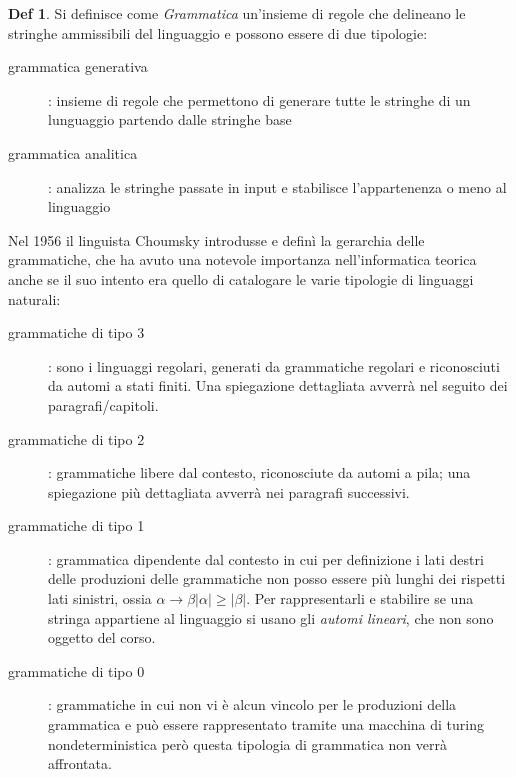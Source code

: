\documentclass[a4paper]{report}
\theoremstyle{definition}%
\newtheorem*{defi}{Def}%
\begin{document}
  \begin{defi}
    Si definisce come \emph{Grammatica} un'insieme di regole che delineano le stringhe ammissibili del linguaggio e
    possono essere di due tipologie:
    \begin{description}
      \item [grammatica generativa] : insieme di regole che permettono di generare tutte le stringhe di un lunguaggio partendo dalle stringhe base 
      \item [grammatica analitica] : analizza le stringhe passate in input e stabilisce l'appartenenza o meno al linguaggio
    \end{description}
    \end{defi}
  Nel 1956 il linguista Choumsky introdusse e definì la gerarchia delle grammatiche, che ha avuto una notevole importanza
  nell'informatica teorica anche se il suo intento era quello di catalogare le varie tipologie di linguaggi naturali:
  \begin{description}
  \item [grammatiche di tipo 3]: sono i linguaggi regolari, generati da grammatiche regolari e riconosciuti da automi a stati finiti.
    Una spiegazione dettagliata avverrà nel seguito dei paragrafi/capitoli.
    
  \item [grammatiche di tipo 2]: grammatiche libere dal contesto, riconosciute da automi a pila; una spiegazione più dettagliata
    avverrà nei paragrafi successivi.
    
  \item [grammatiche di tipo 1]: grammatica dipendente dal contesto in cui per definizione i lati destri delle produzioni delle
    grammatiche non posso essere più lunghi dei rispetti lati sinistri, ossia $\alpha \to \beta |\alpha| \geq |\beta|$.
    Per rappresentarli e stabilire se una stringa appartiene al linguaggio si usano gli \emph{automi lineari}, che non sono oggetto del corso.
    
  \item [grammatiche di tipo 0]: grammatiche in cui non vi è alcun vincolo per le produzioni della grammatica e può essere
         rappresentato tramite una macchina di turing nondeterministica però questa tipologia di grammatica non verrà affrontata.
  \end{description}
  
\end{document}
